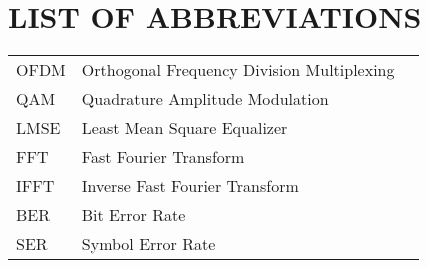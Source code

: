 \section*{LIST OF ABBREVIATIONS}
 {}

\begin{tabularx}{\textwidth}{ L{0.4} L{1.3} L{1.3} }
    OFDM & Orthogonal Frequency Division Multiplexing \\
    QAM & Quadrature Amplitude Modulation \\
    LMSE & Least Mean Square Equalizer \\ %
    FFT & Fast Fourier Transform \\
    IFFT & Inverse Fast Fourier Transform \\
    BER & Bit Error Rate \\
    SER & Symbol Error Rate \\
\end{tabularx}

\newpage